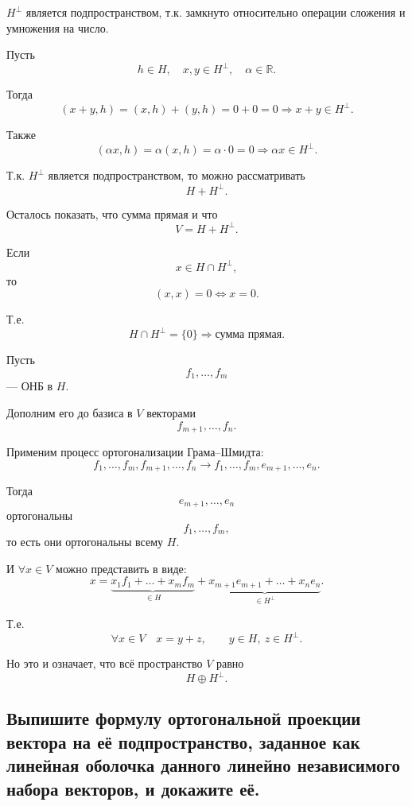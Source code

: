 \begin{Proof}
    $H^{\perp}$ является подпространством, т.к. замкнуто относительно операции сложения и умножения на число.
    
    Пусть
    \[
        h \in H,\quad x,y \in H^{\perp},\quad \alpha \in \mathbb{R}.
    \]
    
    Тогда
    \[
        (x+y,h) = (x,h) + (y,h) = 0 + 0 = 0
        \Rightarrow
        x+y \in H^{\perp}.
    \]
    
    Также
    \[
        (\alpha x,h) = \alpha(x,h) = \alpha \cdot 0 = 0
        \Rightarrow
        \alpha x \in H^{\perp}.
    \]
    
    Т.к. $H^{\perp}$ является подпространством, то можно рассматривать
    \[
        H + H^{\perp}.
    \]
    
    Осталось показать, что сумма прямая и что
    \[
        V = H + H^{\perp}.
    \]
    
    Если
    \[
        x \in H \cap H^{\perp},
    \]
    то
    \[
        (x,x)=0 \Longleftrightarrow x=0.
    \]
    
    Т.е.
    \[
        H \cap H^{\perp} = \{0\}
        \Rightarrow
        \text{сумма прямая.}
    \]
    
    Пусть
    \[
        f_1,\ldots,f_m
    \]
    --- ОНБ в $H$.
    
    Дополним его до базиса в $V$ векторами
    \[
        f_{m+1},\ldots,f_n.
    \]
    
    Применим процесс ортогонализации Грама--Шмидта:
    \[
        f_1,\ldots,f_m,f_{m+1},\ldots,f_n
        \longrightarrow
        f_1,\ldots,f_m,e_{m+1},\ldots,e_n.
    \]
    
    Тогда
    \[
        e_{m+1},\ldots,e_n
    \]
    ортогональны
    \[
        f_1,\ldots,f_m,
    \]
    то есть они ортогональны всему $H$.
    
    И $\forall x \in V$ можно представить в виде:
    \[
        x =
        \underbrace{x_1f_1+\ldots+x_mf_m}_{\in H}
        +
        \underbrace{x_{m+1}e_{m+1}+\ldots+x_ne_n}_{\in H^{\perp}}.
    \]
    
    Т.е.
    \[
        \forall x \in V\quad x = y+z,
        \qquad
        y \in H,\ z \in H^{\perp}.
    \]
    
    Но это и означает, что всё пространство $V$ равно
    \[
        H \oplus H^{\perp}.
    \]
\end{Proof}
\subsection{Выпишите формулу ортогональной проекции вектора на её подпространство, заданное как линейная оболочка данного линейно независимого набора векторов, и докажите её.}

